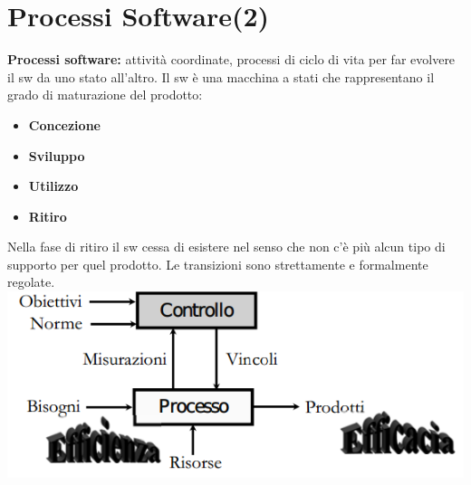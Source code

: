 


\section{Processi Software(2)}
\textbf{Processi software:} attività coordinate, processi di ciclo di vita per far evolvere il sw da uno stato all'altro. Il sw è una macchina a stati che rappresentano il grado di maturazione del prodotto:

\begin{itemize}

	\item \textbf{Concezione}
	\item \textbf{Sviluppo}
	\item \textbf{Utilizzo}
	\item \textbf{Ritiro}

\end{itemize}

Nella fase di ritiro il sw cessa di esistere nel senso che non c'è più alcun tipo di supporto per quel prodotto. Le transizioni sono strettamente e formalmente regolate.	\\

\includegraphics[width=0.75\columnwidth]{img2} %
\\

